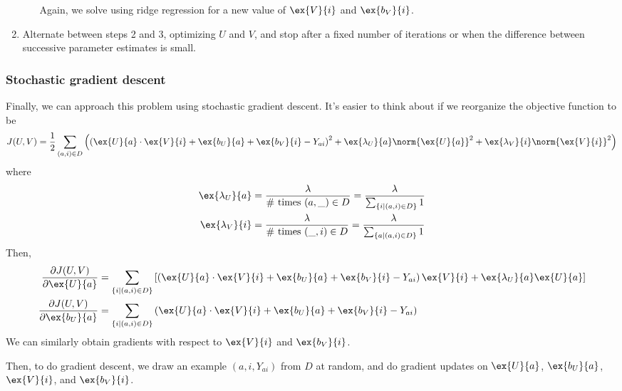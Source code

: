 \begin{enumerate}
\begin{itemize}
        Again, we solve using ridge regression for a new value of
        $\ex{V}{i}$ and $\ex{b_V}{i}$.
    \end{itemize}
  \item Alternate between steps 2 and 3, optimizing $U$ and $V$, and
    stop after a fixed number of iterations or when the difference
    between successive parameter estimates is small.
\end{enumerate}

\subsubsection{Stochastic  gradient descent}
Finally, we can approach this problem using stochastic gradient
descent.  It's easier to think about if we reorganize the objective
function to be
\[
  J(U,V) = \frac{1}{2} \sum_{(a,i)\in D} \left(\left(
           \ex{U}{a} \cdot \ex{V}{i} + \ex{b_U}{a} + \ex{b_V}{i}
           - Y_{ai}\right)^2
           + \ex{\lambda_U}{a} \norm{\ex{U}{a}}^2
           + \ex{\lambda_V}{i}\norm{\ex{V}{i}}^2 \right)
\]
where
\begin{align*}
  \ex{\lambda_U}{a} &= \frac{\lambda}{\# \text{ times }(a, \_) \in D}
    = \frac{\lambda}{\sum_{\{i \mid (a,i) \in D\}} 1} \\
  \ex{\lambda_V}{i} &= \frac{\lambda}{\# \text{ times } (\_, i) \in D}
    = \frac{\lambda}{\sum_{\{a \mid (a,i) \in D\}} 1}
\end{align*}
Then,
\begin{align*}
  \frac{\partial J(U,V)}{\partial \ex{U}{a}}
    &= \sum_{\{i \mid (a,i) \in D\}}
    \left[\left(\ex{U}{a} \cdot \ex{V}{i} + \ex{b_U}{a}
    + \ex{b_V}{i} - Y_{ai}\right) \ex{V}{i}
     + \ex{\lambda_U}{a}\ex{U}{a}\right] \\
  \frac{\partial J(U,V)}{\partial \ex{b_U}{a}}
    &= \sum_{\{i \mid (a,i) \in D\}}
    \left( \ex{U}{a} \cdot \ex{V}{i} + \ex{b_U}{a} + \ex{b_V}{i}
    - Y_{ai}\right)
\end{align*}
We can similarly obtain gradients with respect to $\ex{V}{i}$ and
$\ex{b_V}{i}$.

Then, to do gradient descent, we draw an example $(a, i, Y_{ai})$ from
$D$ at random, and do gradient updates on $\ex{U}{a}$, $\ex{b_U}{a}$,
$\ex{V}{i}$, and $\ex{b_V}{i}$.


